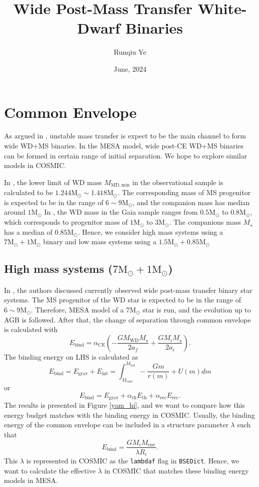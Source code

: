 \documentclass[12pt]{article}
\title{Wide Post-Mass Transfer White-Dwarf Binaries}
\author{Runqiu Ye}
\date{June, 2024}
\newcommand{\Msun}{\mathrm{M_{\odot}}}
\newcommand{\MWD}{M_{\mathrm{WD}}}
\newcommand{\Mstar}{M_{\star}}
\newcommand{\alphace}{\alpha_{\mathrm{CE}}}
\newcommand{\alphath}{\alpha_{\mathrm{th}}}
\newcommand{\alpharec}{\alpha_{\mathrm{rec}}}
\newcommand{\Ebind}{E_{\mathrm{bind}}}
\begin{document}
\maketitle

\section{Common Envelope}

As argued in \cite{yamaguchi_hi,yamaguchi_lo}, unstable mass transfer is expect to be the main channel to form wide WD+MS binaries. In the MESA model, wide post-CE WD+MS binaries can be formed in certain range of initial separation. We hope to explore similar models in COSMIC.

In \cite{yamaguchi_hi}, the lower limit of WD mass $M_{\mathrm{MD, min}}$ in the observational sample is calculated to be $1.244\Msun \sim 1.418\Msun$. The corresponding mass of MS progenitor is expected to be in the range of $6 \sim 9 \Msun$, and the companion mass has median around $1\Msun$ In \cite{yamaguchi_lo}, the WD mass in the Gaia sample ranges from $0.5\Msun$ to $0.8\Msun$, which corresponds to progenitor mass of $1 \Msun$ to $3 \Msun$. The companions mass $\Mstar$ has a median of $0.85 \Msun$. Hence, we consider high mass systems using a $7\Msun + 1\Msun$ binary and low mass systems using a $1.5\Msun + 0.85\Msun$

\subsection{High mass systems ($7\Msun + 1\Msun$)}
In \cite{yamaguchi_hi}, the authors discussed currently observed wide post-mass transfer binary star systems. The MS progenitor of the WD star is expected to be in the range of $6 \sim 9 \Msun$. Therefore, MESA model of a $7\Msun$ star is run, and the evolution up to AGB is followed. After that, the change of separation through common envelope is calculated with
\[
E_{\mathrm{bind}} = \alphace \left(-\frac{G\MWD \Mstar}{2a_f}+\frac{GM_i \Mstar}{2a_i}\right).
\]
The binding energy on LHS is calculated as
\[
E_{\mathrm{bind}} = E_{\mathrm{grav}} + E_{\mathrm{int}} = \int_{M_{\mathrm{core}}}^{M_{\mathrm{tot}}} -\frac{Gm}{r(m)} + U(m) dm
\]
or
\[
E_{\mathrm{bind}} = E_{\mathrm{grav}} + \alphath E_{\mathrm{th}} + \alpharec E_{\mathrm{rec}}.
\]
The results is presented in Figure \ref{yam_hi}, and we want to compare how this energy budget matches with the binding energy in COSMIC. Usually, the binding energy of the common envelope can be included in a structure parameter $\lambda$ such that 
\[
\Ebind = \frac{G M_i M_{\mathrm{env}}}{\lambda R_i}.    
\]
This $\lambda$ is represented in COSMIC as the \verb|lambdaf| flag in \verb|BSEDict|. Hence, we want to calculate the effective $\lambda$ in COSMIC that matches these binding energy models in MESA.
\end{document}
